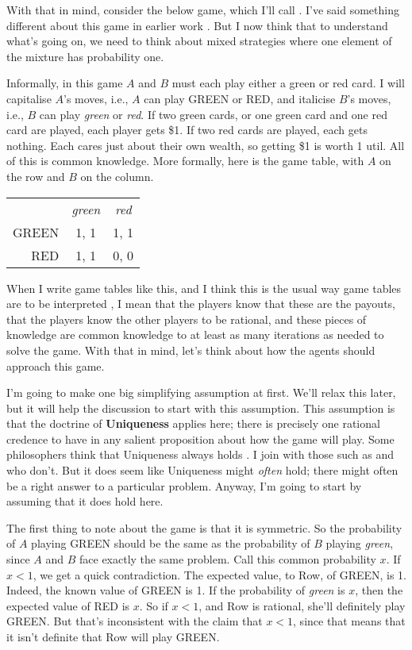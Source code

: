 With that in mind, consider the below game, which I'll call \RG. I've said something different about this game in earlier work \citep{Weatherson2012-WEAGAT}. But I now think that to understand what's going on, we need to think about mixed strategies where one element of the mixture has probability one.

Informally, in this game $A$ and $B$ must each play either a green or red card. I will capitalise $A$'s moves, i.e., $A$ can play GREEN or RED, and italicise $B$'s moves, i.e., $B$ can play \textit{green} or \textit{red}. If two green cards, or one green card and one red card are played, each player gets \$1. If two red cards are played, each gets nothing. Each cares just about their own wealth, so getting \$1 is worth 1 util. All of this is common knowledge. More formally, here is the game table, with $A$ on the row and $B$ on the column.

\begin{center}
\begin{tabular}{r c c}
 & \textit{green} & \textit{red} \\
GREEN & 1, 1 & 1, 1 \\
RED & 1, 1 & 0, 0
\end{tabular}
\end{center}
When I write game tables like this, and I think this is the usual way game tables are to be interpreted \citep{Weatherson2012-WEAKBI}, I mean that the players know that these are the payouts, that the players know the other players to be rational, and these pieces of knowledge are common knowledge to at least as many iterations as needed to solve the game. With that in mind, let's think about how the agents should approach this game.

I'm going to make one big simplifying assumption at first. We'll relax this later, but it will help the discussion to start with this assumption. This assumption is that the doctrine of \textbf{Uniqueness} applies here; there is precisely one rational credence to have in any salient proposition about how the game will play. Some philosophers think that Uniqueness always holds \citep{White2005-WHIEP}. I join with those such as \citet{North2010} and \citet{Schoenfield2013} who don't. But  it does seem like Uniqueness might \textit{often} hold; there might often be a right answer to a particular problem. Anyway, I'm going to start by assuming that it does hold here.

The first thing to note about the game is that it is symmetric. So the probability of $A$ playing GREEN should be the same as the probability of $B$ playing \textit{green}, since $A$ and $B$ face exactly the same problem. Call this common probability $x$. If $x < 1$, we get a quick contradiction. The expected value, to Row, of GREEN, is 1. Indeed, the known value of GREEN is 1. If the probability of \textit{green} is $x$, then the expected value of RED is $x$. So if $x < 1$, and Row is rational, she'll definitely play GREEN. But that's inconsistent with the claim that $x < 1$, since that means that it isn't definite that Row will play GREEN.


